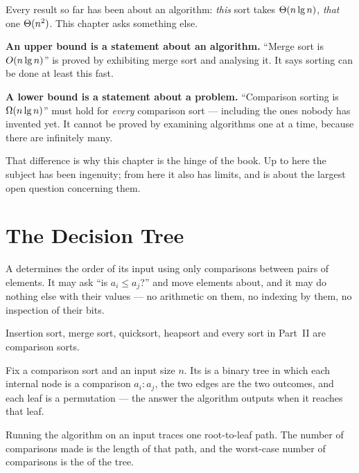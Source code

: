 Every result so far has been about an algorithm: \emph{this} sort takes
$\Theta(n\operatorname{lg} n)$, \emph{that} one $\Theta(n^{2})$. This chapter asks something
else.

\begin{conceptbox}
\textbf{An upper bound is a statement about an algorithm.} ``Merge sort is
$O(n\operatorname{lg} n)$'' is proved by exhibiting merge sort and analysing it. It says
sorting can be done at least this fast.

\smallskip
\textbf{A lower bound is a statement about a problem.} ``Comparison sorting is
$\Omega(n\operatorname{lg} n)$'' must hold for \emph{every} comparison sort --- including the
ones nobody has invented yet. It cannot be proved by examining algorithms one
at a time, because there are infinitely many.

\smallskip
That difference is why this chapter is the hinge of the book. Up to here the
subject has been ingenuity; from here it also has limits, and 
is about the largest open question concerning them.
\end{conceptbox}

\section{The Decision Tree}

\begin{definitionbox}
A  determines the order of its input using only
comparisons between pairs of elements. It may ask ``is $a_{i} \le a_{j}$?'' and
move elements about, and it may do nothing else with their values --- no
arithmetic on them, no indexing by them, no inspection of their bits.

\smallskip
Insertion sort, merge sort, quicksort, heapsort and every sort in Part~II are
comparison sorts.
\end{definitionbox}

\begin{definitionbox}
Fix a comparison sort and an input size $n$. Its  is a
binary tree in which each internal node is a comparison $a_{i} : a_{j}$, the
two edges are the two outcomes, and each leaf is a permutation --- the answer
the algorithm outputs when it reaches that leaf.

\smallskip
Running the algorithm on an input traces one root-to-leaf path. The number of
comparisons made is the length of that path, and the worst-case number of
comparisons is the  of the tree.
\end{definitionbox}

